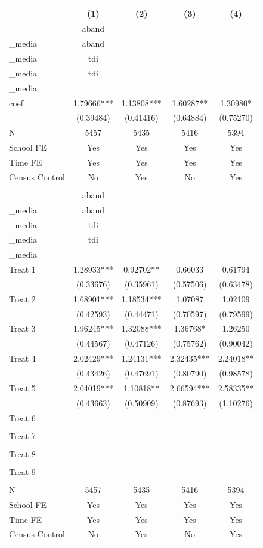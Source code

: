 \begin{table}[!htbp]
\centering
\begin{tabular}{lcccc}
\hline
  & (1) & (2) & (3) & (4) \\
\hline
  & aband\\_media & aband\\_media & tdi\\_media & tdi\\_media \\
coef & 1.79666*** & 1.13808*** & 1.60287** & 1.30980* \\
   & (0.39484) & (0.41416) & (0.64884) & (0.75270) \\
N & 5457 & 5435 & 5416 & 5394 \\
School FE & Yes & Yes & Yes & Yes \\
Time FE & Yes & Yes & Yes & Yes \\
Census Control & No & Yes & No & Yes \\
 &  &  &  &  \\
  & aband\\_media & aband\\_media & tdi\\_media & tdi\\_media \\
Treat 1 & 1.28933*** & 0.92702** & 0.66033 & 0.61794 \\
 & (0.33676) & (0.35961) & (0.57506) & (0.63478) \\
Treat 2 & 1.68901*** & 1.18534*** & 1.07087 & 1.02109 \\
 & (0.42593) & (0.44471) & (0.70597) & (0.79599) \\
Treat 3 & 1.96245*** & 1.32088*** & 1.36768* & 1.26250 \\
 & (0.44567) & (0.47126) & (0.75762) & (0.90042) \\
Treat 4 & 2.02429*** & 1.24131*** & 2.32435*** & 2.24018** \\
 & (0.43426) & (0.47691) & (0.80790) & (0.98578) \\
Treat 5 & 2.04019*** & 1.10818** & 2.66594*** & 2.58335** \\
 & (0.43663) & (0.50909) & (0.87693) & (1.10276) \\
Treat 6 &  &  &  &  \\
 &  &  &  &  \\
Treat 7 &  &  &  &  \\
 &  &  &  &  \\
Treat 8 &  &  &  &  \\
 &  &  &  &  \\
Treat 9 &  &  &  &  \\
 &  &  &  &  \\
N & 5457 & 5435 & 5416 & 5394 \\
School FE & Yes & Yes & Yes & Yes \\
Time FE & Yes & Yes & Yes & Yes \\
Census Control & No & Yes & No & Yes \\
\hline
\end{tabular}
\end{table}
